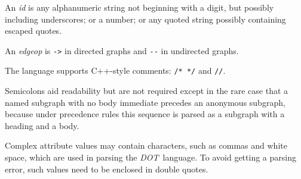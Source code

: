 \documentclass[11pt]{article}
\def\DOT{{\it DOT}}
\begin{document}
An {\it id} is any alphanumeric string not beginning with a digit,
but possibly including underscores; or a number; or any quoted
string possibly containing escaped quotes.

An {\it edgeop} is \verb"->" in directed graphs and \verb"--" in
undirected graphs.

The language supports C++-style comments: \verb"/* */" and \verb"//". 

Semicolons aid readability but are not required except in the rare case
that a named subgraph with no body immediate precedes an anonymous
subgraph, because under precedence rules this sequence is parsed as
a subgraph with a heading and a body.

Complex attribute values may contain characters, such as commas and
white space, which are used in parsing the \DOT\ language. To avoid getting
a parsing error, such values need to be enclosed in double quotes.

\clearpage
\end{document}

